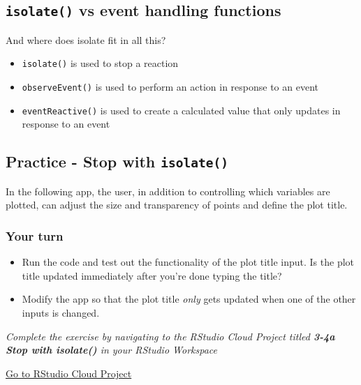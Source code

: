 \documentclass[
  letterpaper,
  DIV=11,
  numbers=noendperiod]{scrreprt}
\providecommand{\tightlist}{%
  \setlength{\itemsep}{0pt}\setlength{\parskip}{0pt}}
\begin{document}
\hypertarget{isolate-vs-event-handling-functions}{%
\subsection{\texorpdfstring{\texttt{isolate()} vs event handling
functions}{isolate() vs event handling functions}}\label{isolate-vs-event-handling-functions}}

And where does isolate fit in all this?

\begin{itemize}
\tightlist
\item
  \texttt{isolate()} is used to stop a reaction
\item
  \texttt{observeEvent()} is used to perform an action in response to an
  event
\item
  \texttt{eventReactive()} is used to create a calculated value that
  only updates in response to an event
\end{itemize}

\hypertarget{practice---stop-with-isolate}{%
\subsection{\texorpdfstring{Practice - Stop with
\texttt{isolate()}}{Practice - Stop with isolate()}}\label{practice---stop-with-isolate}}

In the following app, the user, in addition to controlling which
variables are plotted, can adjust the size and transparency of points
and define the plot title.

\hypertarget{your-turn-24}{%
\subsubsection{Your turn}\label{your-turn-24}}

\begin{itemize}
\tightlist
\item
  Run the code and test out the functionality of the plot title input.
  Is the plot title updated immediately after you're done typing the
  title?
\item
  Modify the app so that the plot title \emph{only} gets updated when
  one of the other inputs is changed.
\end{itemize}

\emph{Complete the exercise by navigating to the RStudio Cloud Project
titled \textbf{3-4a Stop with isolate()} in your RStudio Workspace}

\href{https://rstudio.cloud/spaces/81721/join?access_code=I4VJaNsKfTqR3Td9hLP7E1nz8\%2FtMg6Xbw9Bgqumv}{
Go to RStudio Cloud Project}
\end{document}
